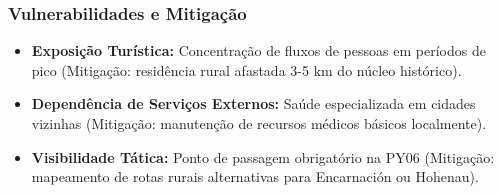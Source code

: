 \subsubsection{Vulnerabilidades e
Mitigação}

\begin{itemize}
\tightlist
\item
  \textbf{Exposição Turística:} Concentração de fluxos de pessoas em
  períodos de pico (Mitigação: residência rural afastada 3-5 km do
  núcleo histórico).
\item
  \textbf{Dependência de Serviços Externos:} Saúde especializada em
  cidades vizinhas (Mitigação: manutenção de recursos médicos básicos
  localmente).
\item
  \textbf{Visibilidade Tática:} Ponto de passagem obrigatório na PY06
  (Mitigação: mapeamento de rotas rurais alternativas para Encarnación
  ou Hohenau).
\end{itemize}

